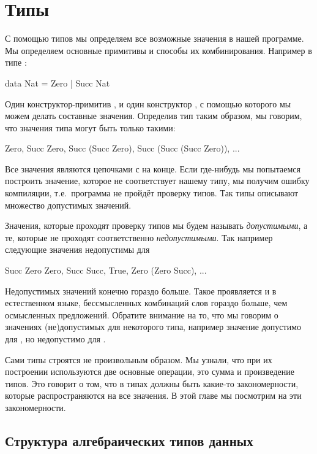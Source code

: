 \setcounter{chapter}{2}
\chapter{Типы}

С помощью типов мы определяем все возможные значения 
в нашей программе. Мы определяем основные примитивы 
и способы их комбинирования.
Например в типе :

\begin{code}
data Nat = Zero | Succ Nat
\end{code}

Один конструктор-примитив , и один конструктор
, с помощью которого мы можем делать составные значения.
Определив тип  таким образом, мы говорим, что 
значения типа  могут быть только такими:

\begin{code}
    Zero,  Succ Zero,  Succ (Succ Zero), Succ (Succ (Succ Zero)), ...
\end{code}

Все значения являются цепочками  
с  на конце. Если где-нибудь мы
попытаемся построить значение, которое не соответствует
нашему типу, мы получим ошибку компиляции, т.е.~программа
не пройдёт проверку типов. Так типы описывают множество
допустимых значений.

Значения, которые проходят проверку 
типов мы будем называть \emph{допустимыми}, а те, 
которые не проходят соответственно \emph{недопустимыми}.
Так например следующие значения недопустимы для 

\begin{code}
    Succ Zero Zero,  Succ Succ, True, Zero (Zero Succ), ...
\end{code}

Недопустимых значений конечно гораздо больше.
Такое проявляется и в естественном языке, бессмысленных
комбинаций слов гораздо больше, чем осмысленных предложений.
Обратите внимание на то, что мы говорим о значениях
(не)допустимых для некоторого типа, например значение
 допустимо для , но недопустимо для
.

Сами типы строятся не произвольным образом. Мы узнали,
что при их построении используются две основные
операции, это сумма и произведение типов.
Это говорит о том, что в типах должны быть
какие-то закономерности, которые распространяются на
все значения. В этой главе мы посмотрим на эти закономерности.

\section{Структура алгебраических типов данных}

